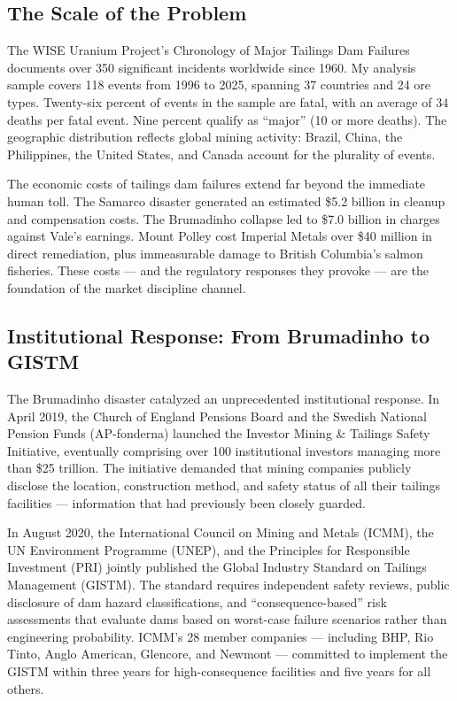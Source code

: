 \documentclass[12pt]{article}
\begin{document}
\subsection{The Scale of the Problem}

The WISE Uranium Project's Chronology of Major Tailings Dam Failures documents over 350 significant incidents worldwide since 1960. My analysis sample covers 118 events from 1996 to 2025, spanning 37 countries and 24 ore types. Twenty-six percent of events in the sample are fatal, with an average of 34 deaths per fatal event. Nine percent qualify as ``major'' (10 or more deaths). The geographic distribution reflects global mining activity: Brazil, China, the Philippines, the United States, and Canada account for the plurality of events.

The economic costs of tailings dam failures extend far beyond the immediate human toll. The Samarco disaster generated an estimated \$5.2 billion in cleanup and compensation costs. The Brumadinho collapse led to \$7.0 billion in charges against Vale's earnings. Mount Polley cost Imperial Metals over \$40 million in direct remediation, plus immeasurable damage to British Columbia's salmon fisheries. These costs --- and the regulatory responses they provoke --- are the foundation of the market discipline channel.

\subsection{Institutional Response: From Brumadinho to GISTM}

The Brumadinho disaster catalyzed an unprecedented institutional response. In April 2019, the Church of England Pensions Board and the Swedish National Pension Funds (AP-fonderna) launched the Investor Mining \& Tailings Safety Initiative, eventually comprising over 100 institutional investors managing more than \$25 trillion. The initiative demanded that mining companies publicly disclose the location, construction method, and safety status of all their tailings facilities --- information that had previously been closely guarded.

In August 2020, the International Council on Mining and Metals (ICMM), the UN Environment Programme (UNEP), and the Principles for Responsible Investment (PRI) jointly published the Global Industry Standard on Tailings Management (GISTM). The standard requires independent safety reviews, public disclosure of dam hazard classifications, and ``consequence-based'' risk assessments that evaluate dams based on worst-case failure scenarios rather than engineering probability. ICMM's 28 member companies --- including BHP, Rio Tinto, Anglo American, Glencore, and Newmont --- committed to implement the GISTM within three years for high-consequence facilities and five years for all others.
\end{document}
